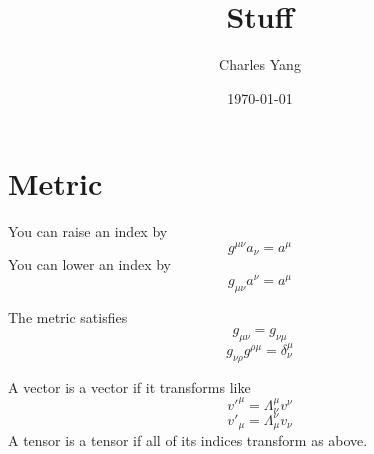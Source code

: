 \documentclass{article}
\title{Stuff}
\author{Charles Yang}
\date{\today}
\begin{document}
\maketitle
\section*{Metric}
You can raise an index by
\[g^{\mu\nu}a_\nu = a^\mu\]
You can lower an index by
\[g_{\mu\nu}a^\nu = a^\mu\]

The metric satisfies
\[g_{\mu\nu} = g_{\nu\mu}\]
\[g_{\nu\rho}g^{\rho\mu} = \delta^\mu_\nu\]

A vector is a vector if it transforms like
\[v'^\mu = \Lambda_{\nu}^\mu v^\nu\]
\[v'_\mu = \Lambda^{\nu}_{\mu}v_\nu\]
A tensor is a tensor if all of its indices transform as above.
\end{document}
